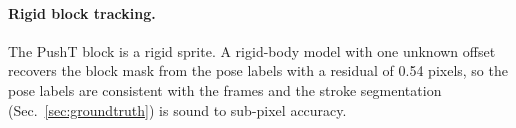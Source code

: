 \documentclass[11pt]{article}
\begin{document}
\paragraph{Rigid block tracking.}
The PushT block is a rigid sprite.
A rigid-body model with one unknown offset recovers the block mask from the pose labels with a residual of 0.54 pixels, so the pose labels are consistent with the frames and the stroke segmentation (Sec.~\ref{sec:groundtruth}) is sound to sub-pixel accuracy.
\end{document}
